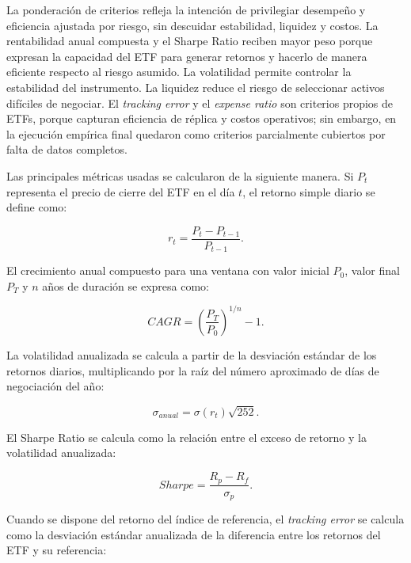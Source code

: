 \documentclass[12pt,letterpaper]{article}
\begin{document}
La ponderación de criterios refleja la intención de privilegiar desempeño y eficiencia ajustada por riesgo, sin descuidar estabilidad, liquidez y costos. La rentabilidad anual compuesta y el Sharpe Ratio reciben mayor peso porque expresan la capacidad del ETF para generar retornos y hacerlo de manera eficiente respecto al riesgo asumido. La volatilidad permite controlar la estabilidad del instrumento. La liquidez reduce el riesgo de seleccionar activos difíciles de negociar. El \textit{tracking error} y el \textit{expense ratio} son criterios propios de ETFs, porque capturan eficiencia de réplica y costos operativos; sin embargo, en la ejecución empírica final quedaron como criterios parcialmente cubiertos por falta de datos completos.


Las principales métricas usadas se calcularon de la siguiente manera. Si $P_t$ representa el precio de cierre del ETF en el día $t$, el retorno simple diario se define como:

\begin{equation}
r_t = \frac{P_t - P_{t-1}}{P_{t-1}}.
\label{eq:retorno_diario}
\end{equation}

El crecimiento anual compuesto para una ventana con valor inicial $P_0$, valor final $P_T$ y $n$ años de duración se expresa como:

\begin{equation}
CAGR = \left(\frac{P_T}{P_0}\right)^{1/n} - 1.
\label{eq:cagr}
\end{equation}

La volatilidad anualizada se calcula a partir de la desviación estándar de los retornos diarios, multiplicando por la raíz del número aproximado de días de negociación del año:

\begin{equation}
\sigma_{anual} = \sigma(r_t)\sqrt{252}.
\label{eq:volatilidad}
\end{equation}

El Sharpe Ratio se calcula como la relación entre el exceso de retorno y la volatilidad anualizada:

\begin{equation}
Sharpe = \frac{R_p - R_f}{\sigma_p}.
\label{eq:sharpe}
\end{equation}

Cuando se dispone del retorno del índice de referencia, el \textit{tracking error} se calcula como la desviación estándar anualizada de la diferencia entre los retornos del ETF y su referencia:
\end{document}
